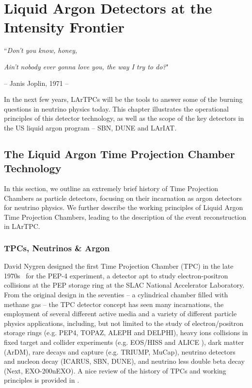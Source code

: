 \chapter{Liquid Argon Detectors at the Intensity Frontier}\label{ch:2}
{\raggedleft ``\emph{Don't you know, honey,} \par}
{\raggedleft \emph{Ain't nobody ever gonna love you, the way I try to do?}"\par}
{\raggedleft -- Janis Joplin,  1971 -- \par}%
\vspace{0.5cm}

In the next few years, LArTPCs will  be the tools to answer some of the burning questions in neutrino physics today.  This chapter illustrates the operational principles of this detector technology, as well as the scope of the key detectors in the US liquid argon program -- SBN, DUNE and LArIAT.


\section{The Liquid Argon Time Projection Chamber Technology}
In this section, we outline an extremely brief history of Time Projection Chambers as particle detectors, focusing on their incarnation as argon detectors for neutrino physics. We further describe the working principles of Liquid Argon Time Projection Chambers, leading  to the description of the event reconstruction in LArTPC.

\subsection{TPCs, Neutrinos \& Argon}
David Nygren designed the first Time Projection Chamber (TPC) in the late 1970s~\cite{FirstTPC} for the  PEP-4 experiment, a detector  apt to study electron-positron collisions at the PEP storage ring at the SLAC National Accelerator Laboratory.
From the original design  in the seventies -- a cylindrical chamber filled with methane gas -- the TPC detector concept has seen many incarnations, the employment of several different active media and a variety of different particle physics applications, including, but not limited to the study of electron/positron storage rings (e.g. PEP4, TOPAZ, ALEPH and DELPHI), heavy ions collisions in fixed target and collider experiments (e.g. EOS/HISS and ALICE ), dark matter (ArDM), rare decays and capture (e.g. TRIUMP, MuCap),  neutrino detectors and nucleon decay (ICARUS, SBN, DUNE), and neutrino less double beta decay (Next, EXO-200\/nEXO). A nice review of the history of TPCs and working principles is provided in \cite{0034-4885-73-11-116201}.

